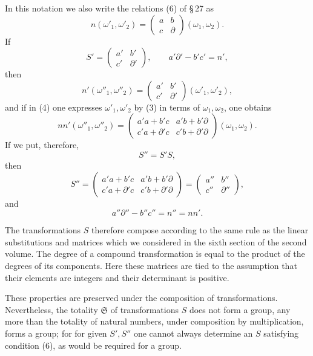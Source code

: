 \documentclass[11pt]{article}
\begin{document}
In this notation we also write the relations (6) of \S\,27 as
\begin{equation}
n(\omega'_1,\omega'_2)=\begin{pmatrix}a&b\\ c&\partial\end{pmatrix}(\omega_1,\omega_2). \tag{3}
\end{equation}
If
\[
S'=\begin{pmatrix}a'&b'\\ c'&\partial'\end{pmatrix},
\qquad a'\partial'-b'c'=n',
\]
then
\begin{equation}
n'(\omega''_1,\omega''_2)=\begin{pmatrix}a'&b'\\ c'&\partial'\end{pmatrix}(\omega'_1,\omega'_2), \tag{4}
\end{equation}
and if in (4) one expresses $\omega'_1,\omega'_2$ by (3) in terms of $\omega_1,\omega_2$, one obtains
\begin{equation}
 nn'(\omega''_1,\omega''_2)
 =\begin{pmatrix}a'a+b'c&a'b+b'\partial\\ c'a+\partial'c&c'b+\partial'\partial\end{pmatrix}(\omega_1,\omega_2). \tag{5}
\end{equation}
If we put, therefore,
\begin{equation}
S''=S'S, \tag{6}
\end{equation}
then
\[
S''=\begin{pmatrix}a'a+b'c&a'b+b'\partial\\ c'a+\partial'c&c'b+\partial'\partial\end{pmatrix}
=\begin{pmatrix}a''&b''\\ c''&\partial''\end{pmatrix},
\]
and
\[
a''\partial''-b''c''=n''=nn'.
\]

The transformations $S$ therefore compose according to the same rule as the linear substitutions and matrices which we considered in the sixth section of the second volume. The degree of a compound transformation is equal to the product of the degrees of its components. Here these matrices are tied to the assumption that their elements are integers and their determinant is positive.

These properties are preserved under the composition of transformations. Nevertheless, the totality $\mathfrak S$ of transformations $S$ does not form a group, any more than the totality of natural numbers, under composition by multiplication, forms a group; for for given $S',S''$ one cannot always determine an $S$ satisfying condition (6), as would be required for a group.
\end{document}
